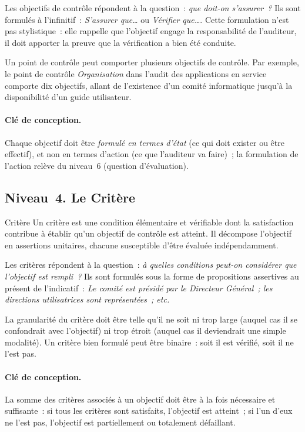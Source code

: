 Les objectifs de contrôle répondent à la question~: \emph{que doit-on
s'assurer~?} Ils sont formulés à l'infinitif~: \emph{S'assurer que\ldots} ou
\emph{Vérifier que\ldots}. Cette formulation n'est pas stylistique~: elle
rappelle que l'objectif engage la responsabilité de l'auditeur, il doit
apporter la preuve que la vérification a bien été conduite.

Un point de contrôle peut comporter plusieurs objectifs de contrôle. Par
exemple, le point de contrôle \emph{Organisation} dans l'audit des applications
en service comporte dix objectifs, allant de l'existence d'un comité
informatique jusqu'à la disponibilité d'un guide utilisateur.

\paragraph{Clé de conception.}
Chaque objectif doit être \emph{formulé en termes d'état} (ce qui doit exister
ou être effectif), et non en termes d'action (ce que l'auditeur va faire)~; la
formulation de l'action relève du niveau~6 (question d'évaluation).

\subsection{Niveau~4. Le Critère}

\begin{boxdef}{Critère}
Un critère est une condition élémentaire et vérifiable dont la satisfaction
contribue à établir qu'un objectif de contrôle est atteint. Il décompose
l'objectif en assertions unitaires, chacune susceptible d'être évaluée
indépendamment.
\end{boxdef}

Les critères répondent à la question~: \emph{à quelles conditions peut-on
considérer que l'objectif est rempli~?} Ils sont formulés sous la forme de
propositions assertives au présent de l'indicatif~: \emph{Le comité est présidé
par le Directeur Général~; les directions utilisatrices sont représentées~;
etc.}

La granularité du critère doit être telle qu'il ne soit ni trop large (auquel
cas il se confondrait avec l'objectif) ni trop étroit (auquel cas il deviendrait
une simple modalité). Un critère bien formulé peut être binaire~: soit il est
vérifié, soit il ne l'est pas.

\paragraph{Clé de conception.}
La somme des critères associés à un objectif doit être à la fois nécessaire et
suffisante~: si tous les critères sont satisfaits, l'objectif est atteint~; si
l'un d'eux ne l'est pas, l'objectif est partiellement ou totalement défaillant.


